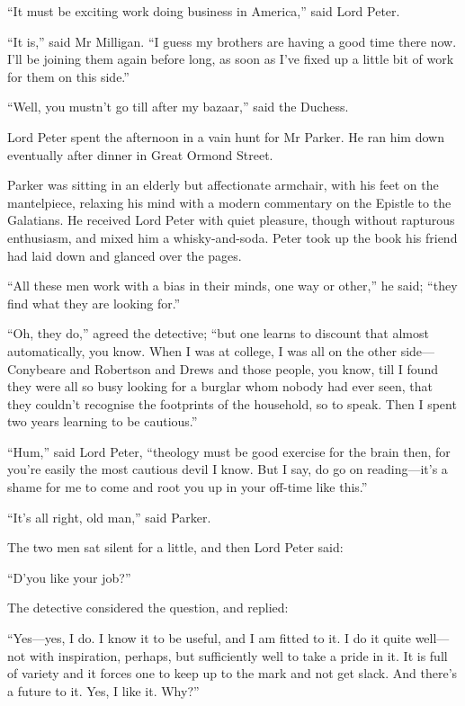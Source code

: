 \enquote{It must be exciting work doing business in America,} said Lord Peter.

\enquote{It is,} said Mr Milligan. \enquote{I guess my brothers are having a good time there now. I’ll be joining them again before long, as soon as I’ve fixed up a little bit of work for them on this side.}

\enquote{Well, you mustn’t go till after my bazaar,} said the Duchess.

Lord Peter spent the afternoon in a vain hunt for Mr Parker. He ran him down eventually after dinner in Great Ormond Street.

Parker was sitting in an elderly but affectionate armchair, with his feet on the mantelpiece, relaxing his mind with a modern commentary on the Epistle to the Galatians. He received Lord Peter with quiet pleasure, though without rapturous enthusiasm, and mixed him a whisky-and-soda. Peter took up the book his friend had laid down and glanced over the pages.

\enquote{All these men work with a bias in their minds, one way or other,} he said; \enquote{they find what they are looking for.}

\enquote{Oh, they do,} agreed the detective; \enquote{but one learns to discount that almost automatically, you know. When I was at college, I was all on the other side\allowbreak---\allowbreak Conybeare and Robertson and Drews and those people, you know, till I found they were all so busy looking for a burglar whom nobody had ever seen, that they couldn’t recognise the footprints of the household, so to speak. Then I spent two years learning to be cautious.}

\enquote{Hum,} said Lord Peter, \enquote{theology must be good exercise for the brain then, for you’re easily the most cautious devil I know. But I say, do go on reading\allowbreak---\allowbreak it’s a shame for me to come and root you up in your off-time like this.}

\enquote{It’s all right, old man,} said Parker.

The two men sat silent for a little, and then Lord Peter said:

\enquote{D’you like your job?}

The detective considered the question, and replied:

\enquote{Yes\allowbreak---\allowbreak yes, I do. I know it to be useful, and I am fitted to it. I do it quite well\allowbreak---\allowbreak not with inspiration, perhaps, but sufficiently well to take a pride in it. It is full of variety and it forces one to keep up to the mark and not get slack. And there’s a future to it. Yes, I like it. Why?}

